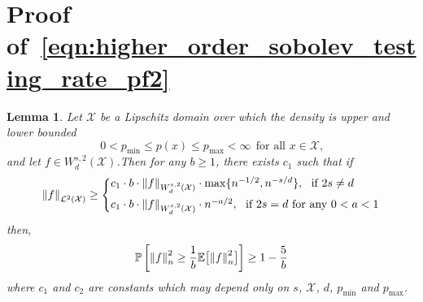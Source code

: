 \documentclass{article}
\newcommand{\1}{\mathbf{1}}
\newcommand{\Xset}{\mathcal{X}}
\newcommand{\Leb}{\mathcal{L}}
\newcommand{\Ebb}{\mathbb{E}}
\theoremstyle{alden}
\theoremstyle{aldenthm}
\newtheorem{lemma}{Lemma}
\theoremstyle{definition}
\theoremstyle{remark}
\begin{document}
\section{Proof of~\eqref{eqn:higher_order_sobolev_testing_rate_pf2}}
\begin{lemma}
	\label{lem:empirical_norm_sobolev}
	Let $\Xset$ be a Lipschitz domain over which the density is upper and lower bounded 
	\begin{equation*}
	0 < p_{\min} \leq p(x) \leq p_{\max} < \infty ~~\textrm{for all $x \in \Xset$,}
	\end{equation*}
	and let $f \in W_d^{s,2}(\Xset)$.Then for any $b \geq 1$, there exists $c_1$ such that if 
	\begin{equation}
	\norm{f}_{\Leb^2(\Xset)} \geq 
	\begin{cases*}
	c_1 \cdot b \cdot \norm{f}_{W_d^{s,2}(\Xset)} \cdot \max\{n^{-1/2},n^{-s/d}\},~~\textrm{if}~2s \neq d \\
	c_1 \cdot b \cdot \norm{f}_{W_d^{s,2}(\Xset)} \cdot n^{-a/2},~~\textrm{if}~ 2s = d ~\textrm{for any}~ 0 < a < 1
	\end{cases*}
	\end{equation}
	then,
	\begin{equation}
	\label{eqn:l2_to_empirical_norm_sobolev}
	\mathbb{P}\left[\norm{f}_n^2 \geq \frac{1}{b} \Ebb\bigl[\norm{f}_n^2\bigr]\right] \geq 1 - \frac{5}{b}
	\end{equation}
	where $c_1$ and $c_2$ are constants which may depend only on $s$, $\Xset$, $d$, $p_{\min}$ and $p_{\max}$.
\end{lemma}
\end{document}
